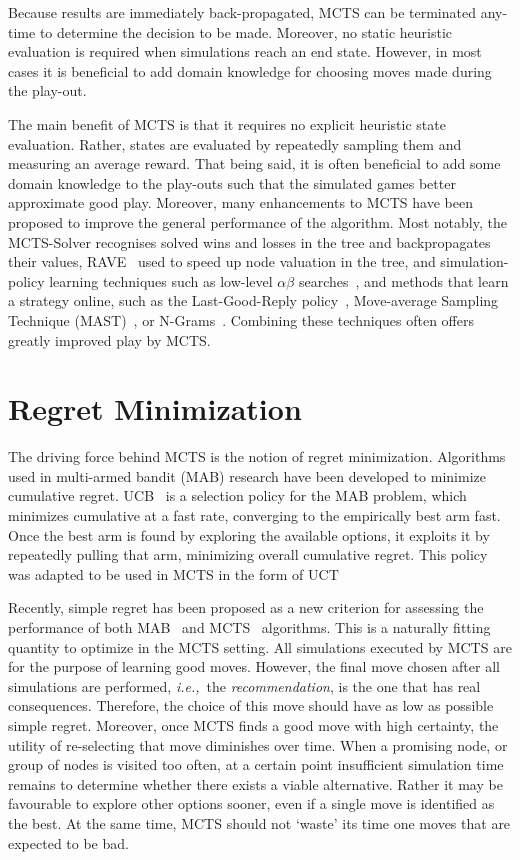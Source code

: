 \documentclass{kecsmstr}
\newcommand{\ie}{{\it i.e.,}~}
\begin{document}
Because results are immediately back-propagated, MCTS can be terminated any-time to determine the decision to be made. Moreover, no static heuristic evaluation is required when simulations reach an end state. However, in most cases it is beneficial to add domain knowledge for choosing moves made during the play-out.

The main benefit of MCTS is that it requires no explicit heuristic state evaluation. Rather, states are evaluated by repeatedly sampling them and measuring an average reward. That being said, it is often beneficial to add some domain knowledge to the play-outs such that the simulated games better approximate good play. Moreover, many enhancements to MCTS have been proposed to improve the general performance of the algorithm. Most notably, the MCTS-Solver  recognises solved wins and losses in the tree and backpropagates their values, RAVE~ used to speed up node valuation in the tree, and simulation-policy learning techniques such as low-level $\alpha\beta$ searches~, and methods that learn a strategy online, such as the Last-Good-Reply policy~, Move-average Sampling Technique (MAST)~, or N-Grams~. Combining these techniques often offers greatly improved play by MCTS.

\section{Regret Minimization}
The driving force behind MCTS is the notion of regret minimization. Algorithms used in multi-armed bandit (MAB) research have been developed to minimize cumulative regret. UCB~ is a selection policy for the MAB problem, which minimizes cumulative at a fast rate, converging to the empirically best arm fast. Once the best arm is found by exploring the available options, it exploits it by repeatedly pulling that arm, minimizing overall cumulative regret. This policy was adapted to be used in MCTS in the form of UCT~

Recently, simple regret has been proposed as a new criterion for assessing the performance of both MAB~ and MCTS~ algorithms. This is a naturally fitting quantity to optimize in the MCTS setting. All simulations executed by MCTS are for the purpose of learning good moves. However, the final move chosen after all simulations are performed, \ie the \emph{recommendation}, is the one that has real consequences. Therefore, the choice of this move should have as low as possible simple regret. Moreover, once MCTS finds a good move with high certainty, the utility of re-selecting that move diminishes over time. When a promising node, or group of nodes is visited too often, at a certain point insufficient simulation time remains to determine whether there exists a viable alternative. Rather it may be favourable to explore other options sooner, even if a single move is identified as the best. At the same time, MCTS should not `waste' its time one moves that are expected to be bad.
\end{document}
